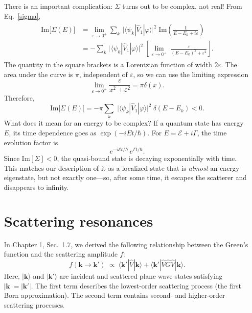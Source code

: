 \documentclass[prx,12pt]{revtex4-2}
\begin{document}
There is an important complication: $\Sigma$ turns out to be complex,
not real!  From Eq.~\eqref{sigma},
\begin{align}
  \begin{aligned}\mathrm{Im}\big[\Sigma(E)\big] &= \lim_{\varepsilon\rightarrow0^+} \sum_k\, \Big| \langle\psi_k| \hat{V}_1|\varphi\rangle\Big|^2 \; \mathrm{Im}\left( \frac{1}{\displaystyle E-E_k+i\varepsilon}\right) \\ &= - \sum_k\, \Big| \langle\psi_k| \hat{V}_1|\varphi\rangle\Big|^2 \; \left[ \lim_{\varepsilon\rightarrow0^+} \; \frac{\varepsilon}{\displaystyle (E-E_k)^2 + \varepsilon^2}\right].\end{aligned}
\end{align}
The quantity in the square brackets is a Lorentzian function of
width $2\varepsilon$.  The area under the curve is $\pi$, independent
of $\varepsilon$, so we can use the limiting expression
\begin{equation}
  \lim_{\varepsilon\rightarrow 0^+} \frac{\varepsilon}{x^2+\varepsilon^2} = \pi\delta(x).
\end{equation}
Therefore,
\begin{equation}
  \mathrm{Im}\big[\Sigma(E)\big]
  = - \pi \sum_k \; \big| \langle\psi_k| \hat{V}_1|\varphi\rangle\big|^2
  \; \delta(E-E_k) < 0.
  \label{fermigr1}
\end{equation}
What does it mean for an energy to be complex?  If a quantum state has
energy $E$, its time dependence goes as $\exp(-iE t/\hbar)$.  For $E =
\mathcal{E} + i \Gamma$, the time evolution factor is
\begin{equation*}
  e^{-i\mathcal{E} t/\hbar} \, e^{\Gamma t/\hbar}.
\end{equation*}
Since $\mathrm{Im}[\Sigma] < 0$, the quasi-bound state is decaying
exponentially with time.  This matches our description of it as a
localized state that is \textit{almost} an energy eigenstate, but not
exactly one---so, after some time, it escapes the scatterer and
disappears to infinity.

\section{Scattering resonances}
\label{sec:scattering_resonances}

In Chapter 1, Sec.~1.7, we derived the following relationship between
the Green's function and the scattering amplitude $f$:
\begin{equation}
  f(\mathbf{k}\rightarrow\mathbf{k}') \;\propto\; \langle \mathbf{k}'|\hat{V}|\mathbf{k}\rangle + \langle \mathbf{k}'|\hat{V}\hat{G}\hat{V}|\mathbf{k}\rangle.
\end{equation}
Here, $|\mathbf{k}\rangle$ and $|\mathbf{k}'\rangle$ are incident and
scattered plane wave states satisfying $|\mathbf{k}|=|\mathbf{k}'|$.
The first term describes the lowest-order scattering process (the
first Born approximation).  The second term contains second- and
higher-order scattering processes.
\end{document}
